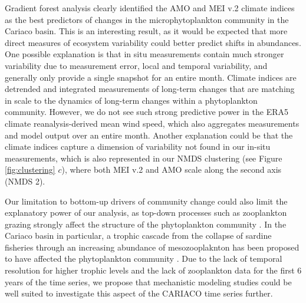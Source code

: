\documentclass[draft]{agujournal2019}
\begin{document}
Gradient forest analysis clearly identified the AMO and MEI v.2 climate indices as the best predictors of changes in the microphytoplankton community in the Cariaco basin. This is an interesting result, as it would be expected that more direct measures of ecosystem variability could better predict shifts in abundances. One possible explanation is that in situ measurements contain much stronger variability due to measurement error, local and temporal variability, and generally only provide a single snapshot for an entire month. Climate indices are detrended and integrated measurements of long-term changes that are matching in scale to the dynamics of long-term changes within a phytoplankton community. However, we do not see such strong predictive power in the ERA5 climate reanalysis-derived mean wind speed, which also aggregates measurements and model output over an entire month. 
Another explanation could be that the climate indices capture a dimension of variability not found in our in-situ measurements, which is also represented in our NMDS clustering (see Figure \ref{fig:clustering} $c$), where both MEI v.2 and AMO scale along the second axis (NMDS 2). %


Our limitation to bottom-up drivers of community change could also limit the explanatory power of our analysis, as top-down processes such as zooplankton grazing strongly affect the structure of the phytoplankton community \cite{banas_adding_2011, acevedo-trejos_mechanisms_2015}. In the Cariaco basin in particular, a trophic cascade from the collapse of sardine fisheries through an increasing abundance of mesozooplaknton has been proposed to have affected the phytoplankton community \cite{muller-karger_scientific_2019}. Due to the lack of temporal resolution for higher trophic levels and the lack of zooplankton data for the first 6 years of the time series, we propose that mechanistic modeling studies could be well suited to investigate this aspect of the CARIACO time series further.
\end{document}
